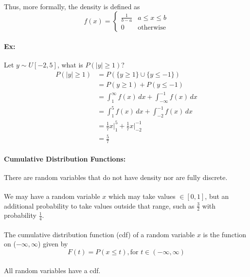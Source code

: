 \documentclass{article}
\begin{document}
\paragraph{}Thus, more formally, the density is defined as
    \[ f(x) = \begin{cases}
        \frac{1}{b-a} & a \le x \le b \\
    0 & \text{otherwise}
    \end{cases}
\]
\paragraph{Ex:}Let $y \sim U[-2,5]$, what is $P(\lvert y \rvert \ge 1)$?
\begin{align*}
    P(\lvert y \rvert \ge 1) &= P(\{y\ge 1\} \cup \{y \le -1\})\\
                             &= P(y \ge 1) + P(y \le -1)\\
                             &= \int_{1}^{\infty} f(x)\,dx + \int_{-\infty}^{-1}f(x)\,dx\\
                             &= \int_{1}^{5} f(x)\,dx + \int_{-2}^{-1}f(x)\,dx\\
                             &= \frac{1}{7}x \big|_{1}^{5} + \frac{1}{7}x \big|_{-2}^{-1}\\
                             &= \frac{5}{7}
\end{align*}
\paragraph{Cumulative Distribution Functions:}There are random variables that do not have density nor are fully discrete.
\paragraph{}We may have a random variable $x$ which may take values $\in [0,1]$, but an additional probability
to take values outside that range, such as $\frac{3}{2}$ with probability $\frac{1}{4}$.

\paragraph{}The cumulative distribution function (cdf) of a random variable $x$ is the function on ($-\infty, \infty$) given by
\[
    F(t) = P(x\le t), \text{for } t \in (-\infty, \infty) 
\]
\paragraph{}All random variables have a cdf.
\end{document}

